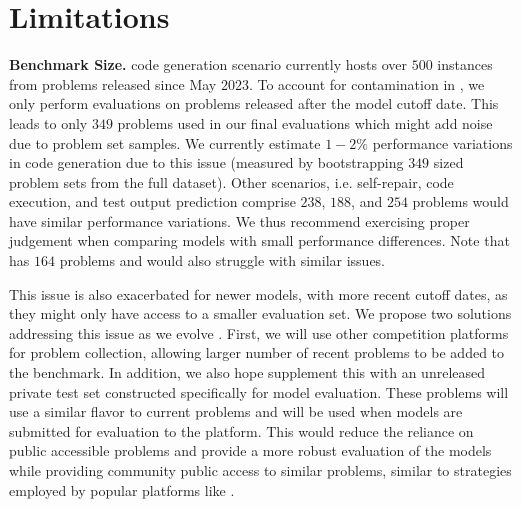 \section{Limitations}
\label{app:sec:limitations}
\noindent \textbf{Benchmark Size.}
\livecodebench{} code generation scenario currently hosts over $500$ instances from problems released since May $2023$.
To account for contamination in \deepseek{}, we only perform evaluations on problems released after the model cutoff date.
This leads to only $349$ problems used in our final evaluations which might add noise due to problem set samples.
We currently estimate $1-2\%$ performance variations in \lcb{} code generation due to this issue (measured by bootstrapping $349$ sized problem sets from the full dataset).
Other scenarios, i.e. self-repair, code execution, and test output prediction comprise $238$, $188$, and $254$ problems would have similar performance variations. 
We thus recommend exercising proper judgement when comparing models with small performance differences.
Note that \humaneval{} has $164$ problems and would also struggle with similar issues.

This issue is also exacerbated for newer models, with more recent cutoff dates, as they might only have access to a smaller evaluation set.
We propose two solutions addressing this issue as we evolve \livecodebench{}.
First, we will use other competition platforms for problem collection, allowing larger number of recent problems to be added to the benchmark.
In addition, we also hope supplement this with an unreleased private test set constructed specifically for model evaluation. 
These problems will use a similar flavor to current problems and will be used when models are submitted for evaluation to the \livecodebench{} platform.
This would reduce the reliance on public accessible problems and provide a more robust evaluation of the models while providing community public access to similar problems, similar to strategies employed by popular platforms like .

